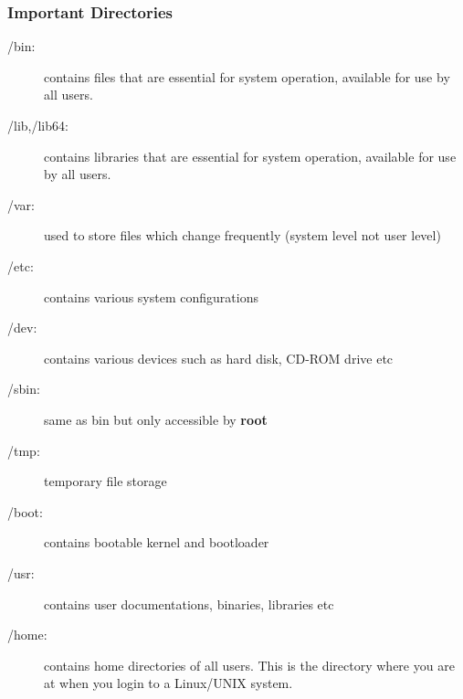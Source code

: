 \documentclass[slidestop,mathserif,compress,xcolor=svgnames]{beamer}
\begin{document}
\begin{frame}
\begin{columns}
\end{columns}
\end{frame}

\begin{frame}
  \frametitle{\small Important Directories}
  \begin{description}
    \item[/bin:] contains files that are essential for system operation, available for use by all users.
    \item[/lib,/lib64:] contains libraries that are essential for system operation, available for use by all users.
    \item[/var:] used to store files which change frequently (system level not user level)
    \item[/etc:] contains various system configurations
    \item[/dev:] contains various devices such as hard disk, CD-ROM drive etc
    \item[/sbin:] same as bin but only accessible by \textbf{root}
    \item[/tmp:] temporary file storage
    \item[/boot:] contains bootable kernel and bootloader
    \item[/usr:] contains user documentations, binaries, libraries etc
    \item[/home:] contains home directories of all users. This is the directory where you are at when you login to a Linux/UNIX system.
  \end{description}
\end{frame}
\end{document}
